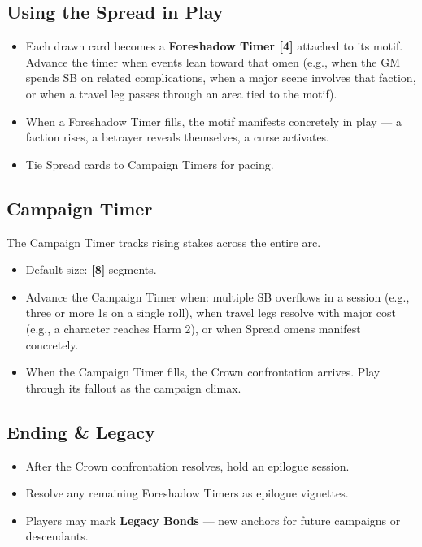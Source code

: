 \subsection{Using the Spread in Play}

\begin{itemize}
  \item Each drawn card becomes a \textbf{Foreshadow Timer [4]} attached to its motif. Advance the timer when events lean toward that omen (e.g., when the GM spends SB on related complications, when a major scene involves that faction, or when a travel leg passes through an area tied to the motif).
  \item When a Foreshadow Timer fills, the motif manifests concretely in play --- a faction rises, a betrayer reveals themselves, a curse activates.
  \item Tie Spread cards to Campaign Timers for pacing.
\end{itemize}

\subsection{Campaign Timer }

The Campaign Timer tracks rising stakes across the entire arc.

\begin{itemize}
  \item Default size: \textbf{[8]} segments.
  \item Advance the Campaign Timer when: multiple SB overflows in a session (e.g., three or more 1s on a single roll), when travel legs resolve with major cost (e.g., a character reaches Harm 2), or when Spread omens manifest concretely.
  \item When the Campaign Timer fills, the Crown confrontation arrives. Play through its fallout as the campaign climax.
\end{itemize}

\subsection{Ending \& Legacy}

\begin{itemize}
  \item After the Crown confrontation resolves, hold an epilogue session.
  \item Resolve any remaining Foreshadow Timers as epilogue vignettes.
  \item Players may mark \textbf{Legacy Bonds} --- new anchors for future campaigns or descendants.
\end{itemize}

